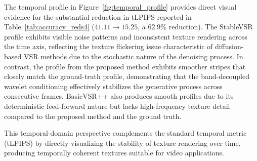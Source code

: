 The temporal profile in Figure~\ref{fig:temporal_profile} 
provides direct visual evidence for the substantial reduction 
in tLPIPS reported in Table~\ref{tab:accuracy_reds4} 
($41.11 \to 15.25$, a $62.9\%$ reduction). The StableVSR 
profile exhibits visible noise patterns and inconsistent 
texture rendering across the time axis, reflecting the texture 
flickering issue characteristic of diffusion-based VSR methods 
due to the stochastic nature of the denoising process. In 
contrast, the profile from the proposed method exhibits 
smoother stripes that closely match the ground-truth profile, 
demonstrating that the band-decoupled wavelet conditioning 
effectively stabilizes the generative process across 
consecutive frames. BasicVSR++ also produces smooth profiles 
due to its deterministic feed-forward nature but lacks 
high-frequency texture detail compared to the proposed method 
and the ground truth.

This temporal-domain perspective complements the standard 
temporal metric (tLPIPS) by directly visualizing the stability 
of texture rendering over time, producing temporally coherent 
textures suitable for video applications.